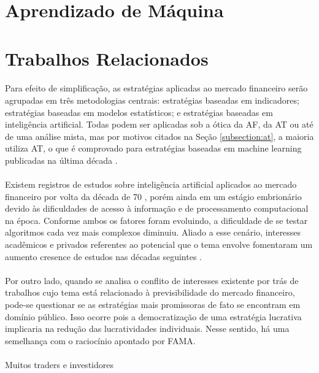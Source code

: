 \section{Aprendizado de Máquina}


\section{Trabalhos Relacionados}

\paragraph{} Para efeito de simplificação, as estratégias aplicadas ao mercado financeiro serão agrupadas em três metodologias centrais: estratégias baseadas em indicadores; estratégias baseadas em modelos estatísticos; e estratégias baseadas em inteligência artificial. Todas podem ser aplicadas sob a ótica da AF, da AT ou até de uma análise mista, mas por motivos citados na Seção \ref{subsection:at}, a maioria utiliza AT, o que é comprovado para estratégias baseadas em machine learning publicadas na última década \cite{nti2020systematic}.

\paragraph{} Existem registros de estudos sobre inteligência artificial aplicados ao mercado financeiro por volta da década de 70 \cite{felsen1975artificial}, porém ainda em um estágio embrionário devido às dificuldades de acesso à informação e de processamento computacional na época. Conforme ambos os fatores foram evoluindo, a dificuldade de se testar algoritmos cada vez mais complexos diminuiu. Aliado a esse cenário, interesses acadêmicos e privados referentes ao potencial que o tema envolve fomentaram um aumento cresence de estudos nas décadas seguintes \cite{atsalakis2009surveying}.

\paragraph{} Por outro lado, quando se analisa o conflito de interesses existente por trás de trabalhos cujo tema está relacionado à previsibilidade do mercado financeiro, pode-se questionar se as estratégias mais promissoras de fato se encontram em domínio público. Isso ocorre pois a democratização de uma estratégia lucrativa implicaria na redução das lucratividades individuais. Nesse sentido, há uma semelhança com o raciocínio apontado por FAMA.

\paragraph{} Muitos traders e investidores
